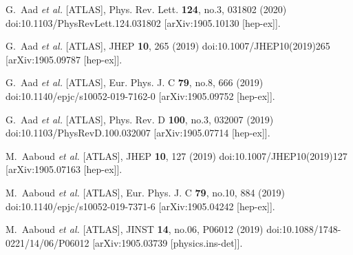 \begin{thebibliography}{9}
G.~Aad \textit{et al.} [ATLAS],
Phys. Rev. Lett. \textbf{124}, no.3, 031802 (2020)
doi:10.1103/PhysRevLett.124.031802
[arXiv:1905.10130 [hep-ex]].

G.~Aad \textit{et al.} [ATLAS],
JHEP \textbf{10}, 265 (2019)
doi:10.1007/JHEP10(2019)265
[arXiv:1905.09787 [hep-ex]].

G.~Aad \textit{et al.} [ATLAS],
Eur. Phys. J. C \textbf{79}, no.8, 666 (2019)
doi:10.1140/epjc/s10052-019-7162-0
[arXiv:1905.09752 [hep-ex]].

G.~Aad \textit{et al.} [ATLAS],
Phys. Rev. D \textbf{100}, no.3, 032007 (2019)
doi:10.1103/PhysRevD.100.032007
[arXiv:1905.07714 [hep-ex]].

M.~Aaboud \textit{et al.} [ATLAS],
JHEP \textbf{10}, 127 (2019)
doi:10.1007/JHEP10(2019)127
[arXiv:1905.07163 [hep-ex]].

M.~Aaboud \textit{et al.} [ATLAS],
Eur. Phys. J. C \textbf{79}, no.10, 884 (2019)
doi:10.1140/epjc/s10052-019-7371-6
[arXiv:1905.04242 [hep-ex]].

M.~Aaboud \textit{et al.} [ATLAS],
JINST \textbf{14}, no.06, P06012 (2019)
doi:10.1088/1748-0221/14/06/P06012
[arXiv:1905.03739 [physics.ins-det]].


\end{thebibliography}
